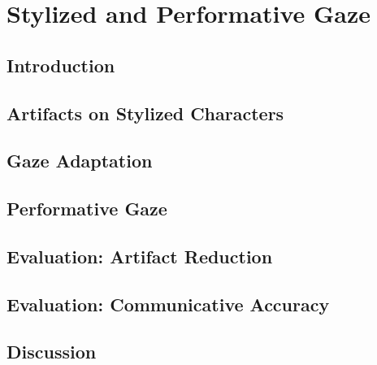 \pagestyle{deposit}

\chapter{Stylized and Performative Gaze}
\label{cha:StylizedGaze}

\section{Introduction}
\label{sec:StylizedGazeIntro}


\section{Artifacts on Stylized Characters}
\label{sec:StylizedGazeArtifacts}


\section{Gaze Adaptation}
\label{sec:StylizedGazeAdaptation}


\section{Performative Gaze}
\label{sec:PerformativeGaze}


\section{Evaluation: Artifact Reduction}
\label{sec:StylizedGazeEvaluation1}


\section{Evaluation: Communicative Accuracy}
\label{sec:StylizedGazeEvaluation2}


\section{Discussion}
\label{sec:StylizedGazeDiscussion}

